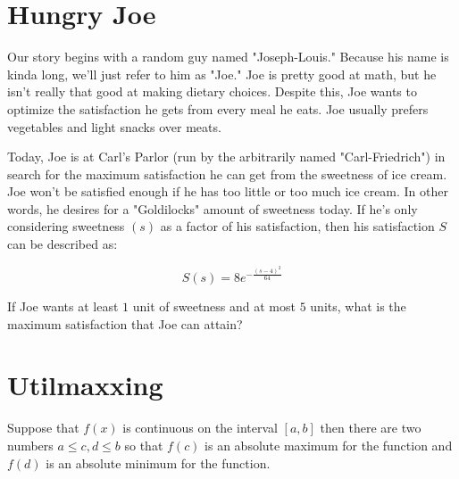 \setcounter{chapter}{0}
\chapter{Hungry Joe}
Our story begins with a random guy named "Joseph-Louis."
Because his name is kinda long, we'll just refer to him as "Joe."
Joe is pretty good at math, but he isn't really that good at making dietary choices.
Despite this, Joe wants to optimize the satisfaction he gets from every meal he eats.
Joe usually prefers vegetables and light snacks over meats.

Today, Joe is at Carl's Parlor (run by the arbitrarily named "Carl-Friedrich") in search for the maximum satisfaction he can get from the sweetness of ice cream.
Joe won't be satisfied enough if he has too little or too much ice cream.
In other words, he desires for a "Goldilocks" amount of sweetness today.
If he's only considering sweetness $(s)$ as a factor of his satisfaction, then his satisfaction $S$ can be described as:\par
\LARGE
\begin{equation}
	S(s) = 8e^{-\frac{(s-4)^2}{64}}
\end{equation}
\normalsize
\begin{eg}
	If Joe wants at least $1$ unit of sweetness and at most $5$ units, what is the maximum satisfaction that Joe can attain?
\end{eg}
\setcounter{chapter}{1}
\chapter{Utilmaxxing}

\begin{theorem}
	Suppose that \(f\left( x \right)\) is continuous on the interval \(\left[ {a,b} \right]\) then there are two numbers \(a \le c,d \le b\) so that \(f\left( c \right)\) is an absolute maximum for the function and \(f\left( d \right)\) is an absolute minimum for the function.
\end{theorem}